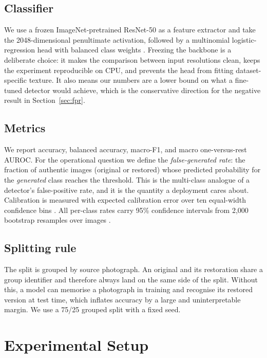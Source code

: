 \documentclass[runningheads]{llncs}
\begin{document}
\subsection{Classifier}

We use a frozen ImageNet-pretrained ResNet-50 \cite{he2016resnet} as a feature
extractor and take the 2048-dimensional penultimate activation, followed by a
multinomial logistic-regression head with balanced class weights
\cite{pedregosa2011sklearn}. Freezing the backbone is a deliberate choice: it makes
the comparison between input resolutions clean, keeps the experiment reproducible on
CPU, and prevents the head from fitting dataset-specific texture. It also means our
numbers are a lower bound on what a fine-tuned detector would achieve, which is the
conservative direction for the negative result in Section~\ref{sec:fpr}.

\subsection{Metrics}

We report accuracy, balanced accuracy, macro-F1, and macro one-versus-rest AUROC. For
the operational question we define the \emph{false-generated rate}: the fraction of
authentic images (original or restored) whose predicted probability for the
\emph{generated} class reaches the threshold. This is the multi-class analogue of a
detector's false-positive rate, and it is the quantity a deployment cares about.
Calibration is measured with expected calibration error over ten equal-width
confidence bins \cite{guo2017calibration}. All per-class rates carry 95\% confidence
intervals from 2{,}000 bootstrap resamples over images \cite{efron1993bootstrap}.

\subsection{Splitting rule}

The split is grouped by source photograph. An original and its restoration share a
group identifier and therefore always land on the same side of the split. Without
this, a model can memorise a photograph in training and recognise its restored
version at test time, which inflates accuracy by a large and uninterpretable margin.
We use a 75/25 grouped split with a fixed seed.

\section{Experimental Setup}
\end{document}
